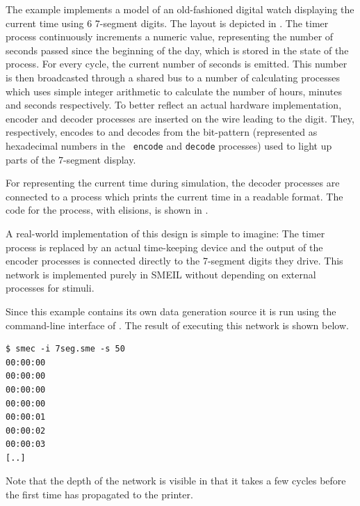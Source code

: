   The example implements a model of an old-fashioned digital watch displaying
  the current time using 6 7-segment digits. The layout is depicted in
  . The timer process continuously increments a numeric value,
  representing the number of seconds passed since the beginning of the day,
  which is stored in the state of the process. For every cycle, the current
  number of seconds is emitted. This number is then broadcasted through a shared
  bus to a number of calculating processes which uses simple integer arithmetic
  to calculate the number of hours, minutes and seconds respectively. To better
  reflect an actual hardware implementation, encoder and decoder processes are
  inserted on the wire leading to the digit. They, respectively, encodes to and
  decodes from the bit-pattern (represented as hexadecimal numbers in the {\tt
    encode} and {\tt decode} processes) used to light up parts of the 7-segment
  display.

  For representing the current time during simulation, the decoder processes are
  connected to a process which prints the current time in a readable format. The
  code for the process, with elisions, is shown in .

  A real-world implementation of this design is simple to imagine: The timer
  process is replaced by an actual time-keeping device and the output of the
  encoder processes is connected directly to the 7-segment digits they
  drive. This network is implemented purely in SMEIL without depending on
  external processes for stimuli.

  Since this example contains its own data generation source it is run using the
  command-line interface of \libsme{}. The result of executing this network is
  shown below.
\begin{verbatim}
$ smec -i 7seg.sme -s 50  
00:00:00
00:00:00
00:00:00
00:00:00
00:00:01
00:00:02
00:00:03
[..]
\end{verbatim}
  Note that the depth of the network is visible in that it takes a few cycles
  before the first time has propagated to the printer.
  
